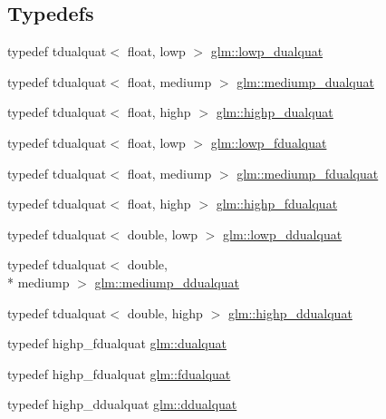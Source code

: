 \subsection*{Typedefs}
\begin{DoxyCompactItemize}
\item 
typedef tdualquat$<$ float, lowp $>$ \hyperlink{group__gtx__dual__quaternion_ga4888200ed911e4887c2423fed74ad362}{glm\-::lowp\-\_\-dualquat}
\item 
typedef tdualquat$<$ float, mediump $>$ \hyperlink{group__gtx__dual__quaternion_gaa88fe93eb823d1aba8d6df8028572cb5}{glm\-::mediump\-\_\-dualquat}
\item 
typedef tdualquat$<$ float, highp $>$ \hyperlink{group__gtx__dual__quaternion_ga98557c3577757f2ced8f35b1de7fa234}{glm\-::highp\-\_\-dualquat}
\item 
typedef tdualquat$<$ float, lowp $>$ \hyperlink{group__gtx__dual__quaternion_ga797f6d2679ab6773c1f057b97bf95111}{glm\-::lowp\-\_\-fdualquat}
\item 
typedef tdualquat$<$ float, mediump $>$ \hyperlink{group__gtx__dual__quaternion_ga93e9def86ffeedd48d9c79a6afacfa6c}{glm\-::mediump\-\_\-fdualquat}
\item 
typedef tdualquat$<$ float, highp $>$ \hyperlink{group__gtx__dual__quaternion_ga8c46d61c38b2b6d9c5091c667dd20fe8}{glm\-::highp\-\_\-fdualquat}
\item 
typedef tdualquat$<$ double, lowp $>$ \hyperlink{group__gtx__dual__quaternion_ga361a2ea6cce1446a8ab7e7803156c16c}{glm\-::lowp\-\_\-ddualquat}
\item 
typedef tdualquat$<$ double, \\*
mediump $>$ \hyperlink{group__gtx__dual__quaternion_ga5727116ab20b2a1d40387766d723dd6c}{glm\-::mediump\-\_\-ddualquat}
\item 
typedef tdualquat$<$ double, highp $>$ \hyperlink{group__gtx__dual__quaternion_ga83e4c5d27c8b0a264a3f3aed24f3f84e}{glm\-::highp\-\_\-ddualquat}
\item 
typedef highp\-\_\-fdualquat \hyperlink{group__gtx__dual__quaternion_ga2f6227b5f9dc08a2e7682065a84b3aa9}{glm\-::dualquat}
\item 
typedef highp\-\_\-fdualquat \hyperlink{group__gtx__dual__quaternion_ga436906129bc69ca5059555cafcbac9fd}{glm\-::fdualquat}
\item 
typedef highp\-\_\-ddualquat \hyperlink{group__gtx__dual__quaternion_ga373431ffdd82d5c03c258217a9e1f1a6}{glm\-::ddualquat}
\end{DoxyCompactItemize}
